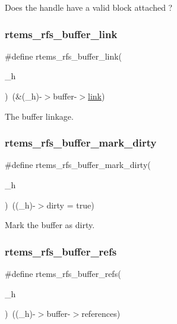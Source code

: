 Does the handle have a valid block attached ? \mbox{\label{rtems-rfs-buffer_8h_a1d8f88aa8f5bf93f53163ab4e5c9a3de}} 
\subsubsection{\texorpdfstring{rtems\_rfs\_buffer\_link}{rtems\_rfs\_buffer\_link}}
{\footnotesize\ttfamily \#define rtems\+\_\+rfs\+\_\+buffer\+\_\+link(\begin{DoxyParamCaption}\item[{}]{\+\_\+h }\end{DoxyParamCaption})~(\&(\+\_\+h)-\/$>$buffer-\/$>$\mbox{\hyperlink{link_8c_a8c94afd0b7e5bb4ce95fefd964241f7f}{link}})}

The buffer linkage. \mbox{\label{rtems-rfs-buffer_8h_a79aed6fb6f1fb4d118c2197184800ddc}} 
\subsubsection{\texorpdfstring{rtems\_rfs\_buffer\_mark\_dirty}{rtems\_rfs\_buffer\_mark\_dirty}}
{\footnotesize\ttfamily \#define rtems\+\_\+rfs\+\_\+buffer\+\_\+mark\+\_\+dirty(\begin{DoxyParamCaption}\item[{}]{\+\_\+h }\end{DoxyParamCaption})~((\+\_\+h)-\/$>$dirty = true)}

Mark the buffer as dirty. \mbox{\label{rtems-rfs-buffer_8h_ab507313ddcfdbc27f2837d5655b81256}} 
\subsubsection{\texorpdfstring{rtems\_rfs\_buffer\_refs}{rtems\_rfs\_buffer\_refs}}
{\footnotesize\ttfamily \#define rtems\+\_\+rfs\+\_\+buffer\+\_\+refs(\begin{DoxyParamCaption}\item[{}]{\+\_\+h }\end{DoxyParamCaption})~((\+\_\+h)-\/$>$buffer-\/$>$references)}

